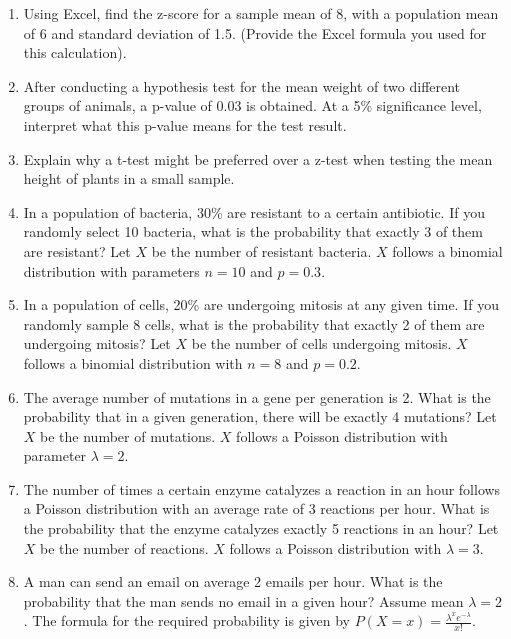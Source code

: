 \documentclass[11pt]{article}
\begin{document}
\begin{enumerate}
    \item Using Excel, find the z-score for a sample mean of 8, with a population mean of 6 and standard deviation of 1.5. (Provide the Excel formula you used for this calculation).

    \item After conducting a hypothesis test for the mean weight of two different groups of animals, a p-value of 0.03 is obtained. At a 5\% significance level, interpret what this p-value means for the test result.

    \item Explain why a t-test might be preferred over a z-test when testing the mean height of plants in a small sample.

    \item In a population of bacteria, 30\% are resistant to a certain antibiotic. If you randomly select 10 bacteria, what is the probability that exactly 3 of them are resistant? Let $X$ be the number of resistant bacteria. $X$ follows a binomial distribution with parameters $n = 10$ and $p = 0.3$.

    \item In a population of cells, 20\% are undergoing mitosis at any given time. If you randomly sample 8 cells, what is the probability that exactly 2 of them are undergoing mitosis? Let $X$ be the number of cells undergoing mitosis. $X$ follows a binomial distribution with $n = 8$ and $p = 0.2$.

    \item The average number of mutations in a gene per generation is 2. What is the probability that in a given generation, there will be exactly 4 mutations? Let $X$ be the number of mutations. $X$ follows a Poisson distribution with parameter $\lambda = 2$.

    \item The number of times a certain enzyme catalyzes a reaction in an hour follows a Poisson distribution with an average rate of 3 reactions per hour. What is the probability that the enzyme catalyzes exactly 5 reactions in an hour? Let $X$ be the number of reactions. $X$ follows a Poisson distribution with $\lambda = 3$.

    \item A man can send an email on average 2 emails per hour. What is the probability that the man sends no email in a given hour? Assume mean $\lambda = 2$. The formula for the required probability is given by $P(X = x) = \frac{\lambda^x e^{-\lambda}}{x!}$.


\end{enumerate}
\end{document}
